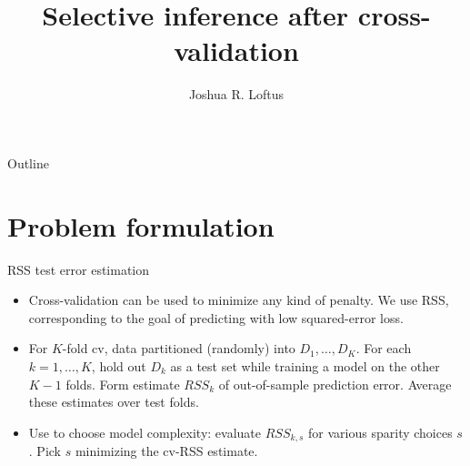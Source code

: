 \documentclass{beamer}
\title[CV inference]{Selective inference after cross-validation}
\author[J. R. Loftus]{Joshua R. Loftus}
\date
\begin{document}
\begin{frame}
  \titlepage %
\end{frame}

\begin{frame}{Outline}
  \tableofcontents
\end{frame}



\section{Problem formulation}
\label{sec:cv}

\begin{frame}{RSS test error estimation}

  \begin{itemize}

  \item Cross-validation can be used to minimize any kind of
    penalty. We use RSS, corresponding to the goal of predicting with
    low squared-error loss.

  \item For $K$-fold cv, data partitioned (randomly) into $D_1,
    \ldots, D_K$. For each $k = 1,\ldots,K$, hold out $D_k$ as a test
    set while training a model on the other $K-1$ folds. Form estimate
    $RSS_k$ of out-of-sample prediction error. Average these estimates
    over test folds. 

  \item Use to choose model complexity: evaluate $RSS_{k,s}$ for
    various sparity choices $s$. Pick $s$ minimizing the cv-RSS estimate.

  \end{itemize}
  
\end{frame}
\end{document}
